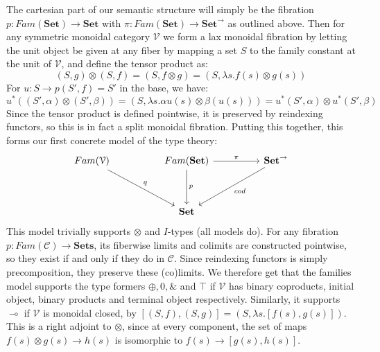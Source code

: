 \documentclass[a4paper,english]{lipics-v2018}
\begin{document}
The cartesian part of our semantic structure will simply be the fibration $p : Fam(\mathbf{Set}) \to \mathbf{Set}$ with $\pi : Fam(\mathbf{Set}) \to \mathbf{Set}^\to$ as outlined above. Then for any symmetric monoidal category $\mathcal{V}$ we form a lax monoidal fibration by letting the unit object be given at any fiber by mapping a set $S$ to the family constant at the unit of $\mathcal{V}$, and define the tensor product as:
\[
(S, g) \otimes (S, f) = (S, f \otimes g) = (S, \lambda s. f(s) \otimes g(s))
\]
For $u : S \to p(S', f) = S'$ in the base, we have:
\[
  u^*((S', \alpha) \otimes (S', \beta)) = (S, \lambda s.\alpha u(s) \otimes \beta(u(s))) = u^*(S', \alpha) \otimes u^*(S', \beta)
\]
Since the tensor product is defined pointwise, it is preserved by reindexing functors, so this is in fact a split monoidal fibration. Putting this together, this forms our first concrete model of the type theory:
\[
\begin{tikzcd}[row sep=huge, column sep=huge]
Fam(\mathcal{V}) \ar[rd, "q"]  & Fam(\mathbf{Set}) \ar[d, "p"] \ar[r, "\pi"] & \mathbf{Set}^\to \ar[ld, "cod"] \\
& \mathbf{Set}
\end{tikzcd}
\]
This model trivially supports $\otimes$ and $I$-types (all models do). For any fibration $p : Fam(\mathcal{C}) \to \mathbf{Sets}$, its fiberwise limits and colimits are constructed pointwise, so they exist if and only if they do in $\mathcal{C}$. Since reindexing functors is simply precomposition, they preserve these (co)limits. We therefore get that the families model supports the type formers $\oplus, 0, \&$ and $\top$ if $\mathcal{V}$ has binary coproducts, initial object, binary products and terminal object respectively. Similarly, it supports $\multimap$ if $\mathcal{V}$ is monoidal closed, by $[(S, f), (S, g)] = (S, \lambda s. [f(s),g(s)])$. This is a right adjoint to $\otimes$, since at every component, the set of maps $f(s) \otimes g(s) \to h(s)$ is isomorphic to $f(s) \to [g(s),h(s)]$.
\end{document}
